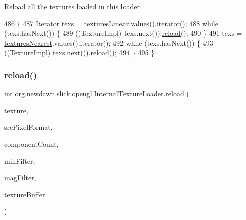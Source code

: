 Reload all the textures loaded in this loader 
\begin{DoxyCode}
486                          \{
487         Iterator texs = \mbox{\hyperlink{classorg_1_1newdawn_1_1slick_1_1opengl_1_1_internal_texture_loader_af5ded371f9b982d890be25766fb2ba46}{texturesLinear}}.values().iterator();
488         \textcolor{keywordflow}{while} (texs.hasNext()) \{
489             ((TextureImpl) texs.next()).\mbox{\hyperlink{classorg_1_1newdawn_1_1slick_1_1opengl_1_1_internal_texture_loader_a104bc76d2e57c583fb713651a08f69a1}{reload}}();
490         \}
491         texs = \mbox{\hyperlink{classorg_1_1newdawn_1_1slick_1_1opengl_1_1_internal_texture_loader_a2212ea841053c4380293000579d0a068}{texturesNearest}}.values().iterator();
492         \textcolor{keywordflow}{while} (texs.hasNext()) \{
493             ((TextureImpl) texs.next()).\mbox{\hyperlink{classorg_1_1newdawn_1_1slick_1_1opengl_1_1_internal_texture_loader_a104bc76d2e57c583fb713651a08f69a1}{reload}}();
494         \}
495     \}
\end{DoxyCode}
\mbox{\label{classorg_1_1newdawn_1_1slick_1_1opengl_1_1_internal_texture_loader_a027f068ce42f53062f37140d09204d6e}} 
\subsubsection{\texorpdfstring{reload()}{reload()}\hspace{0.1cm}{\footnotesize\ttfamily [2/2]}}
{\footnotesize\ttfamily int org.\+newdawn.\+slick.\+opengl.\+Internal\+Texture\+Loader.\+reload (\begin{DoxyParamCaption}\item[{\mbox{\hyperlink{classorg_1_1newdawn_1_1slick_1_1opengl_1_1_texture_impl}{Texture\+Impl}}}]{texture,  }\item[{int}]{src\+Pixel\+Format,  }\item[{int}]{component\+Count,  }\item[{int}]{min\+Filter,  }\item[{int}]{mag\+Filter,  }\item[{Byte\+Buffer}]{texture\+Buffer }\end{DoxyParamCaption})\hspace{0.3cm}{\ttfamily [inline]}}

